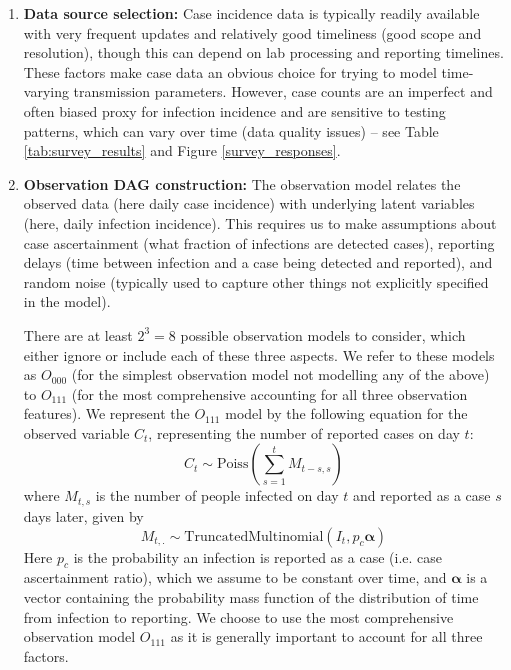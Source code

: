 \documentclass{article}
\begin{document}
\begin{enumerate}
\item \textbf{Data source selection:} Case incidence data is typically readily available with very frequent updates and relatively good timeliness (good scope and resolution), though this can depend on lab processing and reporting timelines. These factors make case data an obvious choice for trying to model time-varying transmission parameters. However, case counts are an imperfect and often biased proxy for infection incidence and are sensitive to testing patterns, which can vary over time (data quality issues) -- see Table \ref{tab:survey_results} and Figure \ref{survey_responses}. 


\item \textbf{Observation DAG construction:} The observation model relates the observed data (here daily case incidence) with underlying latent variables (here, daily infection incidence). 
This requires us to make assumptions about case ascertainment (what fraction of infections are detected cases), reporting delays (time between infection and a case being detected and reported), and random noise (typically used to capture other things not explicitly specified in the model).

There are at least  $2^3=8$ possible observation models to consider, which either ignore or include each of these three aspects.
We refer to these models as $O_{000}$ (for the simplest observation model not modelling any of the above) to $O_{111}$ (for the most comprehensive accounting for all three observation features). We represent the $O_{111}$ model by the following equation for the observed variable $C_t$, representing the number of reported cases on day $t$:
\begin{equation} \label{eq:cases}
    C_t \sim \mathrm{Poiss}\left( \sum_{s=1}^t M_{t-s,s}\right)
\end{equation}
where $M_{t,s}$ is the number of people infected on day $t$ and reported as a case $s$ days later, given by
\begin{equation}
    M_{t,.} \sim \mathrm{TruncatedMultinomial}\left( I_t, p_c \boldsymbol{\alpha} \right) 
\end{equation}
Here $p_c$ is the probability an infection is reported as a case (i.e. case ascertainment ratio), which we assume to be constant over time, and $\boldsymbol{\alpha}$ is a vector containing the probability mass function of the distribution of time from infection to reporting. We choose to use the most comprehensive observation model $O_{111}$ as it is generally important to account for all three factors.




\end{enumerate}
\end{document}
